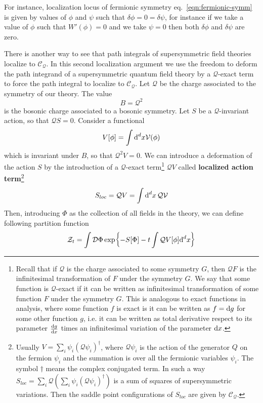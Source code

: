 \documentclass[../main/main.tex]{subfiles}
\begin{document}
For instance, localization locus of fermionic symmetry eq.~\eqref{eqn:fermionic-symm} is given by values of $\phi$ and $\psi$ such that $\delta\phi=0=\delta\psi$, for instance if we take a value of $\phi$ such that $W'(\phi)=0$ and we take $\psi=0$ then both $\delta\phi$ and $\delta\psi$ are zero. 

There is another way to see that path integrals of supersymmetric field theories localize to $\mathcal C_{\mathcal Q}$. In this second localization argument we use the freedom to deform the path integrand of a supersymmetric quantum field theory by a $\mathcal Q$-exact term to force the path integral to localize to  $\mathcal C_{\mathcal Q}$.  Let $\mathcal Q$ be the charge associated to the symmetry of our theory. The value
\[B=\mathcal Q^2\]
is the bosonic charge associated to a bosonic symmetry. Let $S$ be a $\mathcal Q$-invariant action, so that $\mathcal QS=0$. Consider a functional
\[V[\phi]=\int\textup{d}^dx\mathcal V(\phi)\]
which is invariant under $B$, so that $\mathcal Q^2V=0$. We can introduce a deformation of the action $S$ by the introduction of a $\mathcal Q$-exact term\footnote{Recall that if $\mathcal Q$ is the charge associated to some symmetry $G$, then $\mathcal QF$ is the infinitesimal transformation of $F$ under the symmetry $G$. We say that some function is $\mathcal Q$-exact if it can be written as infinitesimal transformation of some function $F$ under the symmetry $G$. This is analogous to exact functions in analysis, where some function $f$ is exact is it can be written as $f=\textup{d} g$ for some other function $g$, i.e. it can be written as total derivative respect to its parameter $\frac{\textup{d} g}{\textup{d} x}$  times an infinitesimal variation of the parameter $\textup{d} x$. } $\mathcal QV$ called   \textbf{localized action term}\footnote{Usually $V=\sum_i\psi_i(\mathcal Q\psi_i)^\dagger$, where $\mathcal Q\psi_i$ is the action of the generator $Q$ on the fermion $\psi_i$ and the summation is over all the fermionic variables $\psi_i$. The symbol $\dagger$ means the complex conjugated term. In such a way $S_{loc}=\sum_i\mathcal Q(\sum_i\psi_i(\mathcal Q\psi_i)^\dagger) $ is a sum of squares of supersymmetric variations. Then the saddle point configurations of $S_{loc}$ are given by $\mathcal C_{\mathcal Q}$.\label{note:usual-form-loc-action}}
\[S_{loc}=\mathcal QV=\int\textup{d}^dx\,\mathcal Q\mathcal V\]
Then, introducing $\Phi$ as the collection of all fields in the theory, we can define following partition function
\begin{equation}\label{eqn:loc-modif-part}
\mathcal Z_t=\int\mathcal D\Phi \exp{-S[\Phi]-t\int \mathcal QV[\phi]\textup{d}^dx}
\end{equation}
\end{document}
